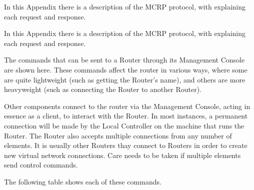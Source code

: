 In this Appendix there is a description of the MCRP protocol, with
explaining each request and response.


In this Appendix there is a description of the MCRP protocol, with
explaining each request and response.


The commands that can be sent to a Router through its Management
Console are shown here.
These commands affect the router in various ways, where some are quite
lightweight (such as getting the Router's name), and others are more
heavyweight (such as connecting the Router to another Router).

Other components connect to the router via the Management Console,
acting in essence as a client, to interact with the Router.
In most instances, a permanent connection will be made by the Local Controller
on the machine that runs the Router.   The Router also accepts
multiple connections from any number of elements. It is  usually other
Routers thay connect to Routers in order to create new virtual network connections.
Care needs
to be taken if multiple elements send control commands.

The following table shows each of these commands.

